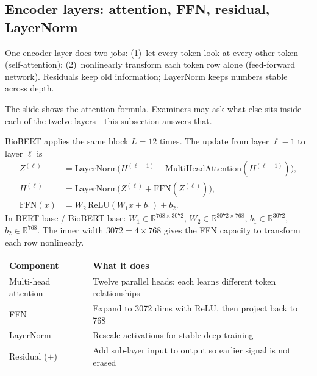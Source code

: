 \subsection{Encoder layers: attention, FFN, residual, LayerNorm}
\label{sec:expl-encoder}

\begin{intuitbox}
One encoder layer does two jobs: (1)~let every token look at every other token (self-attention);
(2)~nonlinearly transform each token row alone (feed-forward network).
Residuals keep old information; LayerNorm keeps numbers stable across depth.
\end{intuitbox}

\begin{whybox}
The slide shows the attention formula. Examiners may ask what else sits inside each of the twelve layers---this subsection answers that.
\end{whybox}

BioBERT applies the same block \(L=12\) times. The update from layer \(\ell-1\) to layer \(\ell\) is
\begin{align}
  Z^{(\ell)} &= \mathrm{LayerNorm}\!\bigl(H^{(\ell-1)} + \mathrm{MultiHeadAttention}(H^{(\ell-1)})\bigr),
  \label{eq:Zell}\\
  H^{(\ell)} &= \mathrm{LayerNorm}\!\bigl(Z^{(\ell)} + \mathrm{FFN}(Z^{(\ell)})\bigr),
  \label{eq:Hell}\\
  \mathrm{FFN}(x) &= W_2\,\mathrm{ReLU}(W_1 x + b_1) + b_2.
  \label{eq:FFN}
\end{align}
In BERT-base / BioBERT-base:
\(W_1 \in \mathbb{R}^{768 \times 3072}\), \(W_2 \in \mathbb{R}^{3072 \times 768}\),
\(b_1 \in \mathbb{R}^{3072}\), \(b_2 \in \mathbb{R}^{768}\).
The inner width \(3072 = 4\times 768\) gives the FFN capacity to transform each row nonlinearly.

\begin{center}
\small
\begin{tabular}{@{}lp{9cm}@{}}
\toprule
Component & What it does \\
\midrule
Multi-head attention & Twelve parallel heads; each learns different token relationships \\
FFN & Expand to 3072 dims with ReLU, then project back to 768 \\
LayerNorm & Rescale activations for stable deep training \\
Residual (\(+\)) & Add sub-layer input to output so earlier signal is not erased \\
\bottomrule
\end{tabular}
\end{center}

